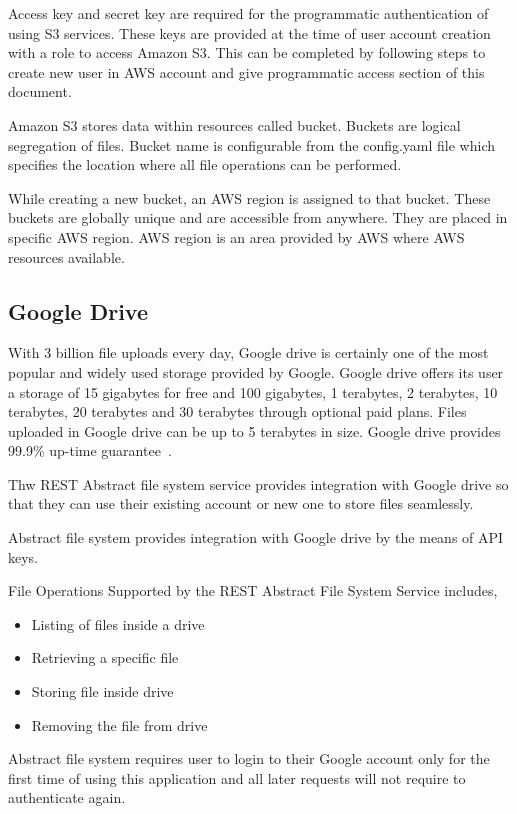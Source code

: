 Access key and secret key are required for the programmatic
authentication of using S3 services. These keys are provided at the
time of user account creation with a role to access Amazon S3.  This
can be completed by following steps to create new user in AWS account
and give programmatic access section of this document.

Amazon S3 stores data within resources called bucket. Buckets are logical
segregation of files. Bucket name is configurable from the config.yaml file
which specifies the location where all file operations can be performed.

While creating a new bucket, an AWS region is assigned to that bucket. These 
buckets are globally unique and are accessible from anywhere. They are
placed in specific AWS region. AWS region is an area provided by AWS where
AWS resources available.

\subsection{Google Drive}

With 3 billion file uploads every day, Google drive is certainly one of the 
most popular and widely used storage provided by Google. Google drive offers 
its user a storage of 15 gigabytes for free and 100 gigabytes, 1 terabytes, 2 
terabytes, 10 terabytes, 20 terabytes and 30 terabytes through optional paid 
plans. Files uploaded in Google drive can be up to 5 terabytes in size. Google 
drive provides 99.9\% up-time guarantee~\cite{hid-sp18-420-google-drive-wiki}. 

Thw REST Abstract file system service provides integration with Google
drive so that they can use their existing account or new one to store
files seamlessly.

Abstract file system provides integration with Google drive by the means of 
API keys. 

File Operations Supported by the REST Abstract File System Service includes,
\begin{itemize}
    \item  Listing of files inside a drive
    \item  Retrieving a specific file 
    \item  Storing file inside drive
    \item  Removing the file from drive
\end{itemize}

Abstract file system requires user to login to their Google
account only for the first time of using this application and all
later requests will not require to authenticate again.

